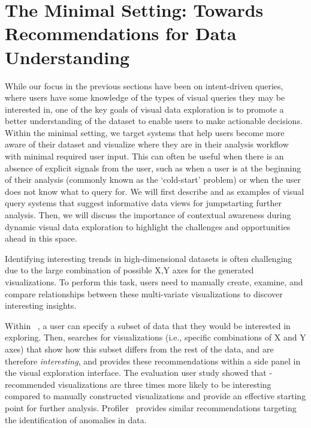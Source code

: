 \section{The Minimal Setting: Towards Recommendations for Data Understanding}\label{sec:minimal}
\par While our focus in the previous sections 
have been on intent-driven queries, 
where users have some knowledge 
of the types of visual queries they may be interested in, 
one of the key goals of visual data exploration 
is to promote a better understanding of the dataset 
to enable users to make actionable decisions. 
Within the minimal setting, we target
systems that help users become more 
aware of their dataset and visualize 
where they are in their analysis workflow 
with minimal required user input. 
This can often be useful when 
there is an absence of explicit signals from the user, 
such as when a user is at the 
beginning of their analysis 
(commonly known as the `cold-start' problem) 
or when the user does not know what to query for. 
We will first describe \seedb and \sbd as 
examples of visual query systems 
that suggest informative data views 
for jumpstarting further analysis. 
Then, we will discuss the importance 
of contextual awareness during dynamic visual data exploration to highlight the challenges and opportunities ahead in this space.

\smallskip
{}
Identifying interesting trends in 
high-dimensional datasets is often challenging 
due to the large combination of possible X,Y axes 
for the generated visualizations. 
To perform this task, users need to manually create, examine, and compare relationships between these multi-variate visualizations 
to discover interesting insights. 

\par Within \seedb~\cite{Vartak2015},
a user can specify a subset of data 
that they would be interested in exploring. 
Then, \seedb searches for visualizations
(i.e., specific combinations of X and Y axes)
that show how this subset differs from the rest 
of the data, and are
therefore {\em interesting},
and provides these recommendations within a side panel
in the visual exploration interface.
The evaluation user study showed that 
\seedb-recommended visualizations are 
three times more likely to be interesting 
compared to manually constructed visualizations 
and provide an effective starting point for further analysis.
Profiler~\cite{Kandel2012} provides similar
recommendations targeting the identification of
anomalies in data.


